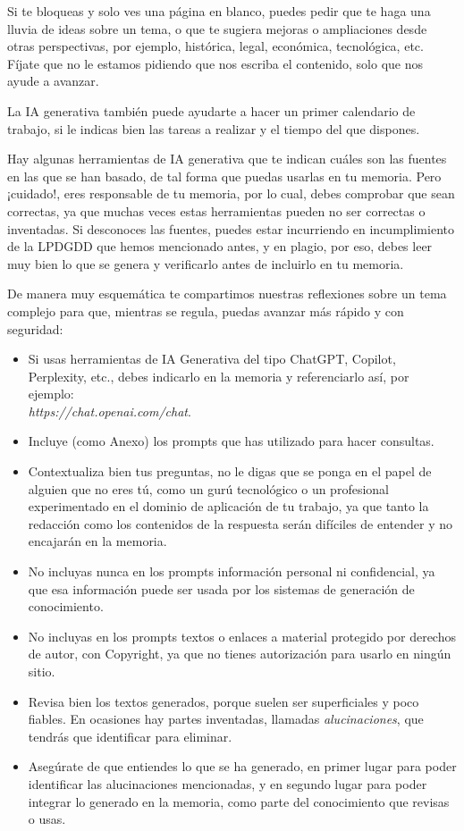 {Si te bloqueas y solo ves una página en blanco, puedes pedir que te haga una lluvia de ideas sobre un tema, o que te sugiera mejoras o ampliaciones desde otras perspectivas, por ejemplo, histórica, legal, económica, tecnológica, etc. Fíjate que no le estamos pidiendo que nos escriba el contenido, solo que nos ayude a avanzar.

La IA generativa también puede ayudarte a hacer un primer calendario de trabajo, si le indicas bien las tareas a realizar y el tiempo del que dispones.

Hay algunas herramientas de IA generativa que te indican cuáles son las fuentes en las que se han basado, de tal forma que puedas usarlas en tu memoria. Pero ¡cuidado!, eres responsable de tu memoria, por lo cual, debes comprobar que sean correctas, ya que muchas veces estas herramientas pueden no ser correctas o inventadas. Si desconoces las fuentes, puedes estar incurriendo en incumplimiento de la LPDGDD que hemos mencionado antes, y en plagio, por eso, debes leer muy bien lo que se genera y verificarlo antes de incluirlo en tu memoria.

De manera muy esquemática te compartimos nuestras reflexiones sobre un tema complejo para que, mientras se regula, puedas avanzar más rápido y con seguridad:

\begin{itemize}  %
    \item Si usas herramientas de IA Generativa del tipo ChatGPT, Copilot, Perplexity, etc., debes indicarlo en la memoria y referenciarlo así, por ejemplo:
    \textit{\\https://chat.openai.com/chat}.
    \item Incluye (como Anexo) los prompts que has utilizado para hacer consultas.
    \item Contextualiza bien tus preguntas, no le digas que se ponga en el papel de alguien que no eres tú, como un gurú tecnológico o un profesional experimentado en el dominio de aplicación de tu trabajo, ya que tanto la redacción como los contenidos de la respuesta serán difíciles de entender y no encajarán en la memoria.
    \item No incluyas nunca en los prompts información personal ni confidencial, ya que esa información puede ser usada por los sistemas de generación de conocimiento.
    \item No incluyas en los prompts textos o enlaces a material protegido por derechos de autor, con Copyright, ya que no tienes autorización para usarlo en ningún sitio.
    \item Revisa bien los textos generados, porque suelen ser superficiales y poco fiables. En ocasiones hay partes inventadas, llamadas \textit{alucinaciones}, que tendrás que identificar para eliminar.
    \item Asegúrate de que entiendes lo que se ha generado, en primer lugar para poder identificar las alucinaciones mencionadas, y en segundo lugar para poder integrar lo generado en la memoria, como parte del conocimiento que revisas o usas.
\end{itemize}

}
